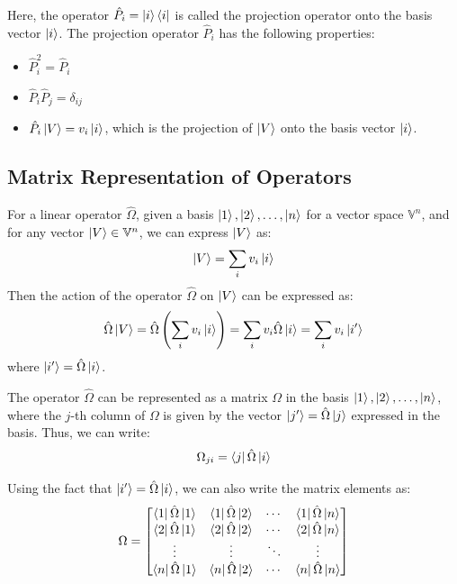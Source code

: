 \documentclass[12pt,a4paper]{report}
\newcommand{\vecspace}[1]{\mathbb{#1}}
\begin{document}
\begin{itemize}
Here, the operator $\hat{P}_i = \ket{i}\bra{i}$ is called the projection operator onto the basis vector $\ket{i}$. The projection operator $\hat{P}_i$ has the following properties:
\begin{itemize}
    \item $\hat{P}_i^2 = \hat{P}_i$
    \item $\hat{P}_i \hat{P}_j = \delta_{ij}$
    \item $\hat{P}_i \ket{V} = v_i \ket{i}$, which is the projection of $\ket{V}$ onto the basis vector $\ket{i}$.
\end{itemize}

\end{itemize}

\subsection{Matrix Representation of Operators}

For a linear operator $\hat{\Omega}$, given a basis $\ket{1}, \ket{2}, \ldots, \ket{n}$ for a vector space $\vecspace{V}^n$, and for any vector $\ket{V} \in \vecspace{V}^n$, we can express $\ket{V}$ as:
\begin{equation*}
    \ket{V} = \sum_{i} v_i \ket{i}
\end{equation*}
Then the action of the operator $\hat{\Omega}$ on $\ket{V}$ can be expressed as:
\begin{equation*}
    \hat{\Omega} \ket{V} = \hat{\Omega} \left( \sum_{i} v_i \ket{i} \right) = \sum_{i} v_i \hat{\Omega} \ket{i} = \sum_{i} v_i \ket{i'}
\end{equation*}
where $\ket{i'} = \hat{\Omega} \ket{i}$.

The operator $\hat{\Omega}$ can be represented as a matrix $\Omega$ in the basis $\ket{1}, \ket{2}, \ldots, \ket{n}$, where the $j$-th column of $\Omega$ is given by the vector $\ket{j'} = \hat{\Omega} \ket{j}$ expressed in the basis. Thus, we can write:
\begin{equation*}
    \Omega_{ji} = \bra{j}\hat{\Omega}\ket{i}
\end{equation*}

Using the fact that $\ket{i'} = \hat{\Omega} \ket{i}$, we can also write the matrix elements as:
\begin{equation*}
    \Omega = \begin{bmatrix}
        \bra{1}\hat{\Omega}\ket{1} & \bra{1}\hat{\Omega}\ket{2} & \cdots & \bra{1}\hat{\Omega}\ket{n} \\
        \bra{2}\hat{\Omega}\ket{1} & \bra{2}\hat{\Omega}\ket{2} & \cdots & \bra{2}\hat{\Omega}\ket{n} \\
        \vdots & \vdots & \ddots & \vdots \\
        \bra{n}\hat{\Omega}\ket{1} & \bra{n}\hat{\Omega}\ket{2} & \cdots & \bra{n}\hat{\Omega}\ket{n}
    \end{bmatrix}
\end{equation*}
\end{document}
